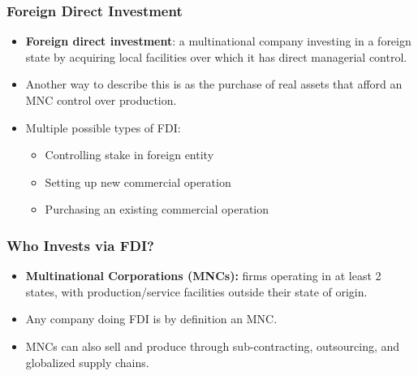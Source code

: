 \documentclass[handout]{beamer}
\begin{document}
\begin{frame} 
	\frametitle{\LARGE{Foreign Direct Investment}}
	\begin{itemize}
		\item \textbf{Foreign direct investment}: a multinational company investing in a foreign state by acquiring local facilities over which it has direct managerial control. \pause 
		\item Another way to describe this is as the purchase of real assets that afford an MNC control over production.
		\item Multiple possible types of FDI: 
		\begin{itemize}
			\item Controlling stake in foreign entity \pause 
			\item Setting up new commercial operation \pause 
			\item Purchasing an existing commercial operation  
		\end{itemize}
		
	\end{itemize}
\end{frame}

\begin{frame} 
	\frametitle{\LARGE{Who Invests via FDI?}}
	\begin{itemize}
		\item \textbf{Multinational Corporations (MNCs):} firms operating in at least 2 states, with production/service facilities outside their state of origin. \pause 
		\item Any company doing FDI is by definition an MNC. \pause 
		\item MNCs can also sell and produce through sub-contracting, outsourcing, and globalized supply chains. 
	\end{itemize}
\end{frame}
\end{document}
